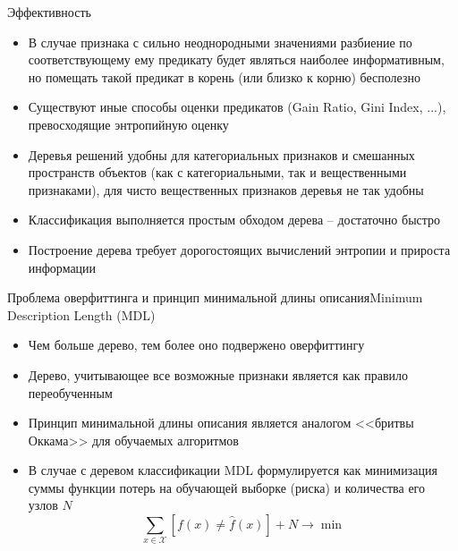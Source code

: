 \documentclass[compress,red,unicode]{beamer}
\begin{document}
\begin{frame}{Эффективность}
\begin{itemize}
	\item В случае признака с сильно неоднородными значениями разбиение по соответствующему ему предикату будет являться наиболее информативным, но помещать такой предикат в корень (или близко к корню) бесполезно
	\item Существуют иные способы оценки предикатов (Gain Ratio, Gini Index, ...), превосходящие энтропийную оценку
	\item Деревья решений удобны для категориальных признаков и смешанных пространств объектов (как с категориальными, так и вещественными признаками), для чисто вещественных признаков деревья не так удобны
	\item Классификация выполняется простым обходом дерева -- достаточно быстро
	\item Построение дерева требует дорогостоящих вычислений энтропии и прироста информации

\end{itemize}
\end{frame}


\begin{frame}{Проблема оверфиттинга и принцип минимальной длины описания}{Minimum Description Length (MDL)}
\begin{itemize}
	\item Чем больше дерево, тем более оно подвержено оверфиттингу
	\item Дерево, учитывающее все возможные признаки является как правило переобученным 
	\item Принцип минимальной длины описания является аналогом <<бритвы Оккама>> для обучаемых алгоритмов
	\item В случае с деревом классификации MDL формулируется как минимизация суммы функции потерь на обучающей выборке (риска) и количества его узлов $N$
$$
\sum_{x\in\mathcal{X}} [f(x)\ne\hat f(x)] + N\to \min
$$

\end{itemize}
\end{frame}



%
\end{document}
